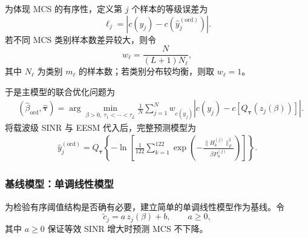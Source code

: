 \documentclass[bwprint]{gmcmthesis}
\numberwithin{figure}{section}
\begin{document}
为体现 MCS 的有序性，定义第 $j$ 个样本的等级误差为
\begin{equation}
	\ell_j=\left|c(y_j)-c\left(\widehat y_j^{(\mathrm{ord})}\right)\right|.
\end{equation}
若不同 MCS 类别样本数差异较大，则令
\begin{equation}
	w_\ell=\frac{N}{(L+1)N_\ell},
\end{equation}
其中 $N_\ell$ 为类别 $m_\ell$ 的样本数；若类别分布较均衡，则取 $w_\ell=1$。

于是主模型的联合优化问题为
\begin{equation}
	\boxed{
	\begin{aligned}
	&\left(\widehat\beta_{\mathrm{ord}},\widehat{\boldsymbol{\tau}}\right)
	=
	\arg\min_{\beta>0,\ \tau_1<\cdots<\tau_L}
	\frac{1}{N}\sum_{j=1}^{N}
	w_{c(y_j)}
	\left|
	c(y_j)-c\left[Q_{\boldsymbol{\tau}}\left(z_j(\beta)\right)\right]
	\right|.
	\end{aligned}
	}
	\label{eq:joint-ord}
\end{equation}
将载波级 SINR 与 EESM 代入后，完整预测模型为
\begin{equation}
	\boxed{
	\begin{aligned}
	\widehat y_j^{(\mathrm{ord})}
	=
	Q_{\boldsymbol{\tau}}
	\left\{
	-\ln
	\left[
	\frac{1}{122}\sum_{k=1}^{122}
	\exp
	\left(
	-\frac{\|H_k^{(j)}\|_F^2}{\beta P_n^{(j)}}
	\right)
	\right]
	\right\}.
	\end{aligned}
	}
	\label{eq:full-ord}
\end{equation}

\subsubsection{基线模型：单调线性模型}

为检验有序阈值结构是否确有必要，建立简单的单调线性模型作为基线。令
\begin{equation}
	\boxed{
	\widetilde c_j=a\,z_j(\beta)+b,
	\qquad a\ge0,
	}
	\label{eq:linear-cont}
\end{equation}
其中 $a\ge0$ 保证等效 SINR 增大时预测 MCS 不下降。
\end{document}
